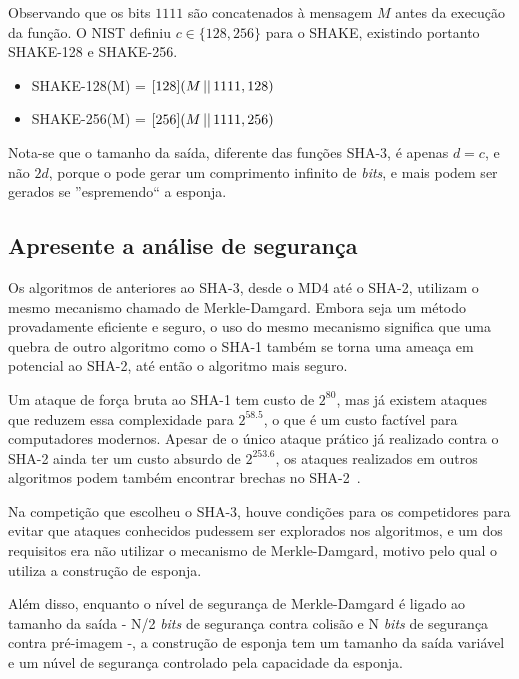 \begin{enumerate}[label=\roman*.]
        Observando que os bits $1111$ são concatenados à mensagem $M$ antes da
        execução da função. O NIST definiu $c \in \{128, 256\}$ para o SHAKE,
        existindo portanto SHAKE-128 e SHAKE-256.

        \begin{itemize}
            \setlength\itemsep{0.2em}
            \item SHAKE-128(M) = \Keccak$[128](M \operatorname{\lvert\rvert} 1111, 128)$
            \item SHAKE-256(M) = \Keccak$[256](M \operatorname{\lvert\rvert} 1111, 256)$
        \end{itemize}

        Nota-se que o tamanho da saída, diferente das funções SHA-3, é apenas
        $d = c$, e não $2d$, porque o \Keccak{} pode gerar um comprimento
        infinito de \textit{bits}, e mais podem ser gerados se ''espremendo``
        a esponja.
\end{enumerate}

\subsection{Apresente a análise de segurança}

Os algoritmos de  anteriores ao SHA-3, desde o MD4 até o SHA-2,
utilizam o mesmo mecanismo chamado de Merkle-Damgard. Embora seja um método
provadamente eficiente e seguro, o uso do mesmo mecanismo significa que uma
quebra de outro algoritmo como o SHA-1 também se torna uma ameaça em potencial
ao SHA-2, até então o algoritmo mais seguro.

Um ataque de força bruta ao SHA-1 tem custo de $2^{80}$, mas já existem ataques
que reduzem essa complexidade para $2^{58.5}$, o que é um custo factível para
computadores modernos. Apesar de o único ataque prático já realizado contra o
SHA-2 ainda ter um custo absurdo de $2^{253.6}$, os ataques realizados em
outros algoritmos podem também encontrar brechas no SHA-2~\cite{dobbs:2013}.

Na competição que escolheu o SHA-3, houve condições para os competidores para
evitar que ataques conhecidos pudessem ser explorados nos algoritmos, e um dos
requisitos era não utilizar o mecanismo de Merkle-Damgard, motivo pelo qual o
\Keccak utiliza a construção de esponja.

Além disso, enquanto o nível de segurança de Merkle-Damgard é ligado ao tamanho
da saída - N/2 \textit{bits} de segurança contra colisão e N \textit{bits} de
segurança contra pré-imagem -, a construção de esponja tem um tamanho da saída
variável e um núvel de segurança controlado pela capacidade da esponja.

